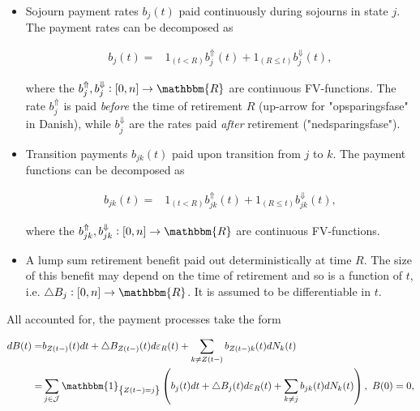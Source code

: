\documentclass{article}
\newcommand{\1}[1]{\mathbbm{1}_{\left\lbrace #1 \right\rbrace}}
\theoremstyle{break}
\theoremstyle{remark}
\numberwithin{equation}{section}
\begin{document}
\begin{itemize}
    \item Sojourn payment rates $b_j(t)$ paid continuously during sojourns in state $j$. The payment rates can be decomposed as
    
    \begin{align*}
        b_j(t) =& 1_{\left( t<R \right)} b_j^{\Uparrow}(t) + 1_{\left( R \leq t \right)} b_j^{\Downarrow}(t),
    \end{align*}
    
    where the $b_j^{\Uparrow}, b_j^{\Downarrow}: [0,n] \to \mathbbm{R}$ are continuous FV-functions. The rate $b_j^{\Uparrow}$ is paid \textit{before} the time of retirement $R$ (up-arrow for "opsparingsfase" in Danish), while $b_j^{\Downarrow}$ are the rates paid \textit{after} retirement ("nedsparingsfase").
    
    
    
    \item Transition payments $b_{jk}(t)$ paid upon transition from $j$ to $k$. The payment functions can be decomposed as
    
    \begin{align*}
        b_{jk}(t) =& 1_{\left( t<R \right)} b_{jk}^{\Uparrow}(t) + 1_{\left( R \leq t \right)} b_{jk}^{\Downarrow}(t),
    \end{align*}
    
    where the $b_{jk}^{\Uparrow}, b_{jk}^{\Downarrow}: [0,n] \to \mathbbm{R}$ are continuous FV-functions.
    
    
    
    \item A lump sum retirement benefit paid out deterministically at time $R$. The size of this benefit may depend on the time of retirement and so is a function of $t$, i.e. $\triangle B_j: [0,n] \to \mathbbm{R}$. It is assumed to be differentiable in $t$.
\end{itemize}

All accounted for, the payment processes take the form

\begin{align} \label{PaymentProcessDef}
\begin{split}
	    dB(t) =& b_{Z(t-)}(t)dt + \triangle B_{Z(t-)}(t) d \varepsilon_{R}(t) + \sum_{k \neq Z(t-)}b_{{Z(t-)}k}(t)dN_{k}(t) \\
    =& \sum_{j \in \mathcal{J}} \1{Z(t-)=j} \left( b_j(t)dt + \triangle B_j(t) d \varepsilon_{R}(t) + \sum_{k \neq j}b_{jk}(t)dN_{k}(t) \right), \, \, B(0) = 0,
\end{split}
\end{align}
\end{document}
